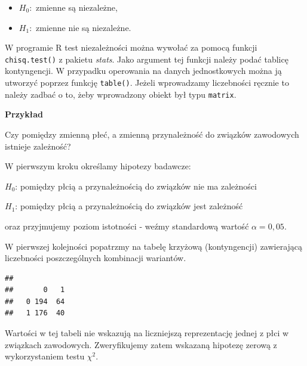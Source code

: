\documentclass[]{book}
\newenvironment{Shaded}{\begin{snugshade}}{\end{snugshade}}
\newcommand{\KeywordTok}[1]{\textcolor[rgb]{0.13,0.29,0.53}{\textbf{#1}}}
\newcommand{\NormalTok}[1]{#1}
\newcommand{\OperatorTok}[1]{\textcolor[rgb]{0.81,0.36,0.00}{\textbf{#1}}}
\providecommand{\tightlist}{%
  \setlength{\itemsep}{0pt}\setlength{\parskip}{0pt}}
\begin{document}
\begin{itemize}
\tightlist
\item
  \(H_0:\) zmienne są niezależne,
\item
  \(H_1:\) zmienne nie są niezależne.
\end{itemize}

W programie R test niezależności można wywołać za pomocą funkcji \texttt{chisq.test()} z pakietu \emph{stats}. Jako argument tej funkcji należy podać tablicę kontyngencji. W przypadku operowania na danych jednostkowych można ją utworzyć poprzez funkcję \texttt{table()}. Jeżeli wprowadzamy liczebności ręcznie to należy zadbać o to, żeby wprowadzony obiekt był typu \texttt{matrix}.

\textbf{Przykład}

Czy pomiędzy zmienną płeć, a zmienną przynależność do związków zawodowych istnieje zależność?

W pierwszym kroku określamy hipotezy badawcze:

\(H_0\): pomiędzy płcią a przynależnością do związków nie ma zależności

\(H_1\): pomiędzy płcią a przynależnością do związków jest zależność

oraz przyjmujemy poziom istotności - weźmy standardową wartość \(\alpha = 0,05\).

W pierwszej kolejności popatrzmy na tabelę krzyżową (kontyngencji) zawierającą liczebności poszczególnych kombinacji wariantów.

\begin{Shaded}
\end{Shaded}

\begin{verbatim}
##    
##       0   1
##   0 194  64
##   1 176  40
\end{verbatim}

Wartości w tej tabeli nie wskazują na liczniejszą reprezentację jednej z płci w związkach zawodowych. Zweryfikujemy zatem wskazaną hipotezę zerową z wykorzystaniem testu \(\chi^2\).

\begin{Shaded}
\end{Shaded}
\end{document}
